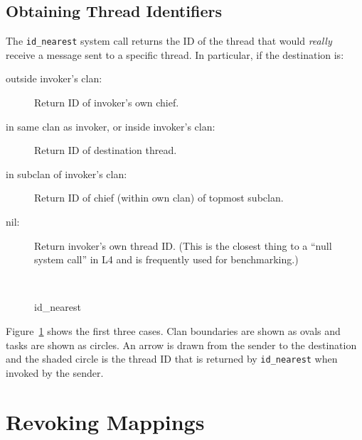 
\subsection{Obtaining Thread Identifiers}


The {\footnotesize\verb+id_nearest+} system call returns the ID of the thread that
would \emph{really} receive a message sent to a specific thread. In
particular, if the destination is:

\begin{description}

        \item[outside invoker's clan:] Return ID of invoker's own chief.

        \item[in same clan as invoker, or inside invoker's clan:] Return ID of destination thread.

        \item[in subclan of invoker's clan:] Return ID of chief (within own
        clan) of topmost subclan.

        \item[nil:] Return invoker's own thread ID. (This is the closest
        thing to a ``null system call'' in L4 and is frequently used for
        benchmarking.)

\end{description}

\begin{figure}[h]
\centering
\mbox{\quad
      \quad
      }
\caption{id\_nearest}
\label{fig:id}
\end{figure}

Figure~\ref{fig:id} shows the first three cases. Clan boundaries are
shown as ovals and tasks are shown as circles. An arrow is drawn from
the sender to the destination and the shaded circle is the thread ID
that is returned by {\footnotesize\verb+id_nearest+} when invoked by the sender.


\section{Revoking Mappings}

